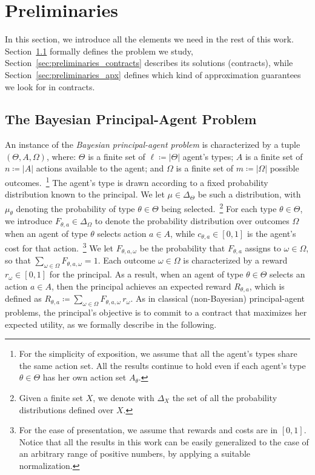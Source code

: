 \section{Preliminaries}\label{sec:preliminaries}

%
In this section, we introduce all the elements we need in the rest of this work.
%
Section~\ref{sec:preliminaries_problem} formally defines the problem we study, Section~\ref{sec:preliminaries_contracts} describes its solutions (contracts), while Section~\ref{sec:preliminaries_apx} defines which kind of approximation guarantees we look for in contracts.


\subsection{The Bayesian Principal-Agent Problem}\label{sec:preliminaries_problem}


An instance of the \emph{Bayesian principal-agent problem} is characterized by a tuple $(\Theta,A,\Omega)$, where: $\Theta$ is a finite set of $\ell \coloneqq |\Theta|$ agent's types; $A$ is a finite set of $n \coloneqq |A|$ actions available to the agent; and $\Omega$ is a finite set of $m \coloneqq |\Omega|$ possible outcomes.~\footnote{For the simplicity of exposition, we assume that all the agent's types share the same action set. All the results continue to hold even if each agent's type $\theta \in \Theta$ has her own action set $A_\theta$.}
%
The agent's type is drawn according to a fixed probability distribution known to the principal. 
%
We let $\mu \in \Delta_{\Theta}$ be such a distribution, with $\mu_\theta$ denoting the probability of type $\theta \in \Theta$ being selected.~\footnote{Given a finite set $X$, we denote with $\Delta_X$ the set of all the probability distributions defined over $X$.}
%
For each type $\theta \in \Theta$, we introduce $F_{\theta, a} \in \Delta_\Omega$ to denote the probability distribution over outcomes $ \Omega$ when an agent of type $\theta$ selects action $a \in A$, while $c_{\theta, a} \in [0,1]$ is the agent's cost for that action.~\footnote{For the ease of presentation, we assume that rewards and costs are in $[0,1]$. Notice that all the results in this work can be easily generalized to the case of an arbitrary range of positive numbers, by applying a suitable normalization.}
%
We let $F_{\theta, a, \omega} $ be the probability that $F_{\theta, a}$ assigns to $\omega \in \Omega$, so that $\sum_{\omega \in \Omega} F_{\theta, a, \omega}  =1$.
%
Each outcome $\omega \in \Omega$ is characterized by a reward $r_\omega \in [0,1]$ for the principal.
%
As a result, when an agent of type $\theta \in \Theta$ selects an action $a \in A$, then the principal achieves an expected reward $R_{\theta,a}$, which is defined as $R_{\theta,a} \coloneqq \sum_{\omega \in \Omega} F_{\theta, a, \omega} \, r_\omega$.
%
As in classical (non-Bayesian) principal-agent problems, the principal's objective is to commit to a contract that maximizes her expected utility, as we formally describe in the following.


